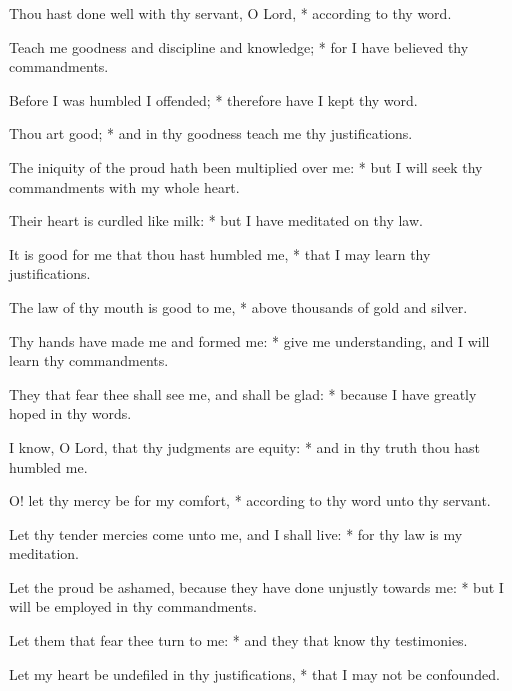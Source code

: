 \item Thou hast done well with thy servant, O Lord, * according to thy word.
\item Teach me goodness and discipline and knowledge; * for I have believed thy commandments.
\item Before I was humbled I offended; * therefore have I kept thy word.
\item Thou art good; * and in thy goodness teach me thy justifications.
\item The iniquity of the proud hath been multiplied over me: * but I will seek thy commandments with my whole heart.
\item Their heart is curdled like milk: * but I have meditated on thy law.
\item It is good for me that thou hast humbled me, * that I may learn thy justifications.
\item The law of thy mouth is good to me, * above thousands of gold and silver.
\item Thy hands have made me and formed me: * give me understanding, and I will learn thy commandments.
\item They that fear thee shall see me, and shall be glad: * because I have greatly hoped in thy words.
\item I know, O Lord, that thy judgments are equity: * and in thy truth thou hast humbled me.
\item O! let thy mercy be for my comfort, * according to thy word unto thy servant.
\item Let thy tender mercies come unto me, and I shall live: * for thy law is my meditation.
\item Let the proud be ashamed, because they have done unjustly towards me: * but I will be employed in thy commandments.
\item Let them that fear thee turn to me: * and they that know thy testimonies.
\item Let my heart be undefiled in thy justifications, * that I may not be confounded.